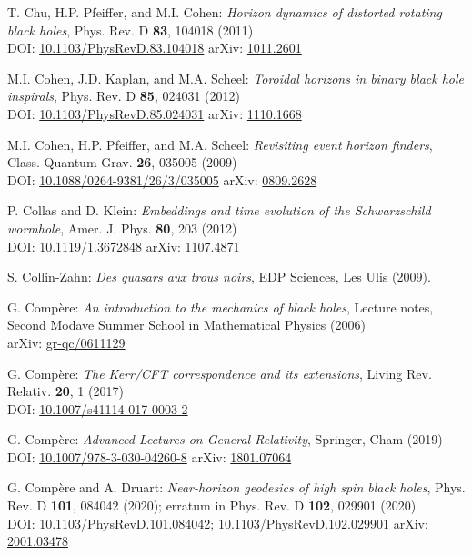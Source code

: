 \begin{thebibliography}{123}
T. Chu, H.P. Pfeiffer, and M.I. Cohen:
{\em Horizon dynamics of distorted rotating black holes},
Phys. Rev. D {\bf 83}, 104018 (2011)\\
DOI: \href{https://doi.org/10.1103/PhysRevD.83.104018}{10.1103/PhysRevD.83.104018}\hfill
arXiv: \href{https://arxiv.org/abs/1011.2601}{1011.2601}

M.I. Cohen, J.D. Kaplan, and M.A. Scheel:
{\em Toroidal horizons in binary black hole inspirals},
Phys. Rev. D {\bf 85}, 024031 (2012)\\
DOI: \href{https://doi.org/10.1103/PhysRevD.85.024031}{10.1103/PhysRevD.85.024031}\hfill
arXiv: \href{https://arxiv.org/abs/1110.1668}{1110.1668}

M.I. Cohen, H.P. Pfeiffer, and M.A. Scheel:
{\em Revisiting event horizon finders},
Class. Quantum Grav. {\bf 26}, 035005 (2009)\\
DOI: \href{https://doi.org/10.1088/0264-9381/26/3/035005}{10.1088/0264-9381/26/3/035005}\hfill
arXiv: \href{https://arxiv.org/abs/0809.2628}{0809.2628}

P. Collas and D. Klein:
{\em Embeddings and time evolution of the Schwarzschild wormhole},
Amer. J. Phys. {\bf 80}, 203 (2012)\\
DOI: \href{https://doi.org/10.1119/1.3672848}{10.1119/1.3672848}\hfill
arXiv: \href{https://arxiv.org/abs/1107.4871}{1107.4871}

S. Collin-Zahn:
{\em Des quasars aux trous noirs},
EDP Sciences, Les Ulis (2009).

G. Compère:
{\em An introduction to the mechanics of black holes},
Lecture notes, Second Modave Summer School in Mathematical Physics (2006)\\
arXiv: \href{https://arxiv.org/abs/gr-qc/0611129}{gr-qc/0611129}

G. Compère:
{\em The Kerr/CFT correspondence and its extensions},
Living Rev. Relativ. {\bf 20}, 1 (2017)\\
DOI: \href{https://doi.org/10.1007/s41114-017-0003-2}{10.1007/s41114-017-0003-2}

G. Compère:
{\em Advanced Lectures on General Relativity},
Springer, Cham (2019)\\
DOI: \href{https://doi.org/10.1007/978-3-030-04260-8}{10.1007/978-3-030-04260-8}\hfill
arXiv: \href{https://arxiv.org/abs/1801.07064}{1801.07064}

G. Compère and A. Druart:
{\em Near-horizon geodesics of high spin black holes},
Phys. Rev. D {\bf 101}, 084042 (2020); erratum in Phys. Rev. D {\bf 102}, 029901 (2020)\\
DOI: \href{https://doi.org/10.1103/PhysRevD.101.084042}{10.1103/PhysRevD.101.084042};
\href{https://doi.org/10.1103/PhysRevD.102.029901}{10.1103/PhysRevD.102.029901}\hfill
arXiv: \href{https://arxiv.org/abs/2001.03478}{2001.03478}


\end{thebibliography}
